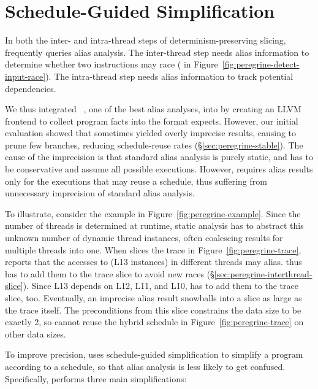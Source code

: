 \section{Schedule-Guided Simplification} \label{sec:peregrine-guide}

In both the inter- and intra-thread steps of determinism-preserving
slicing, \peregrine frequently queries alias analysis.  The inter-thread step
needs alias information to determine whether two instructions may race
( in Figure~\ref{fig:peregrine-detect-input-race}).  The intra-thread step
needs alias information to track potential dependencies.

We thus integrated \bddbddb~\cite{bddbddb,bddalias:pldi04}, one of the best alias analyses,
into \peregrine by creating an LLVM frontend to collect program facts into
the format \bddbddb expects.  However, our initial evaluation showed that
\bddbddb sometimes yielded overly imprecise results, causing \peregrine to prune
few branches, reducing schedule-reuse rates (\S\ref{sec:peregrine-stable}).  The
cause of the imprecision is that
standard alias analysis is purely static, and has to be conservative and
assume all possible executions.  However, \peregrine requires alias results
only for the executions that may reuse a schedule, thus suffering
from unnecessary imprecision of standard alias analysis.


To illustrate, consider the example in Figure~\ref{fig:peregrine-example}.  Since the
number of threads is determined at runtime, static analysis has to abstract
this unknown number of dynamic thread instances, often coalescing
results for multiple threads into one.  When \peregrine slices the trace in
Figure~\ref{fig:peregrine-trace}, \bddbddb reports that the accesses to  
(L13 instances) in different threads may alias.
\peregrine thus has to add them to the trace slice to avoid new races
(\S\ref{sec:peregrine-interthread-slice}).  Since L13 depends 
on L12, L11, and L10, \peregrine has to add them to the trace slice, too.
Eventually, an imprecise alias result snowballs into a slice
as large as the trace itself.  The preconditions from this slice
constrains the data size to be exactly 2, so \peregrine cannot reuse
the hybrid schedule in Figure~\ref{fig:peregrine-trace} on other data sizes.


To improve precision, \peregrine uses schedule-guided simplification to simplify
a program according to a schedule, so that 
alias analysis is less likely to get confused.  
Specifically, \peregrine performs three main simplifications:

